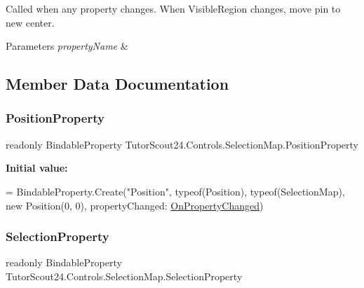 Called when any property changes. When Visible\+Region changes, move pin to new center. 


\begin{DoxyParams}{Parameters}
{\em property\+Name} & \\
\hline
\end{DoxyParams}


\subsection{Member Data Documentation}
\mbox{\label{class_tutor_scout24_1_1_controls_1_1_selection_map_a8340d61ae4ccd228a4602de567ba30d6}} 
\subsubsection{\texorpdfstring{Position\+Property}{PositionProperty}}
{\footnotesize\ttfamily readonly Bindable\+Property Tutor\+Scout24.\+Controls.\+Selection\+Map.\+Position\+Property\hspace{0.3cm}{\ttfamily [static]}}

{\bfseries Initial value\+:}
\begin{DoxyCode}
= BindableProperty.Create(\textcolor{stringliteral}{"Position"}, typeof(Position), typeof(SelectionMap),
            \textcolor{keyword}{new} Position(0, 0), propertyChanged: \mbox{\hyperlink{class_tutor_scout24_1_1_controls_1_1_selection_map_ab2558decc7d57c270b0fe0f5977be530}{OnPropertyChanged}})
\end{DoxyCode}
\mbox{\label{class_tutor_scout24_1_1_controls_1_1_selection_map_a76fb5991de3db4d3346bd4b638125ab3}} 
\subsubsection{\texorpdfstring{Selection\+Property}{SelectionProperty}}
{\footnotesize\ttfamily readonly Bindable\+Property Tutor\+Scout24.\+Controls.\+Selection\+Map.\+Selection\+Property\hspace{0.3cm}{\ttfamily [static]}}

